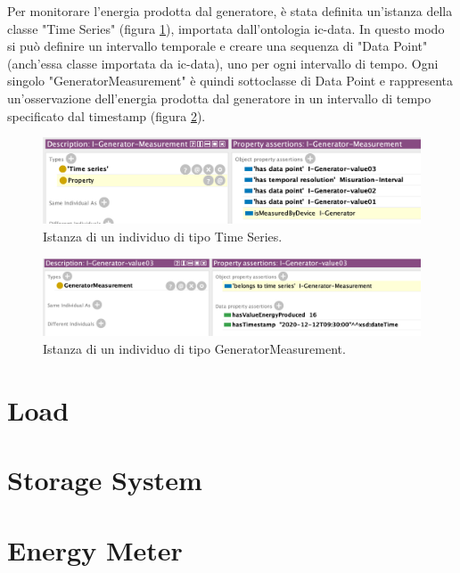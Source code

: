 Per monitorare l'energia prodotta dal generatore, è stata definita un'istanza della classe "Time Series" (figura \ref*{fig:individual_genmeas}), importata dall'ontologia ic-data. In questo modo si può definire un intervallo temporale e creare una sequenza di "Data Point"(anch'essa classe importata da ic-data), uno per ogni intervallo di tempo. Ogni singolo "GeneratorMeasurement" è quindi sottoclasse di Data Point e rappresenta un'osservazione dell'energia prodotta dal generatore in un intervallo di tempo specificato dal timestamp (figura \ref*{fig:individual_genval3}).
\begin{figure}[!ht]
    \centering
    \includegraphics[width=12cm]{images/individual_genmeas.png}
    \caption{Istanza di un individuo di tipo Time Series.}
    \label{fig:individual_genmeas}
\end{figure}
\begin{figure}[!ht]
    \centering
    \includegraphics[width=12cm]{images/individual_genval3.png}
    \caption{Istanza di un individuo di tipo GeneratorMeasurement.}
    \label{fig:individual_genval3}
\end{figure}


\section{Load}

\section{Storage System}

\section{Energy Meter}


